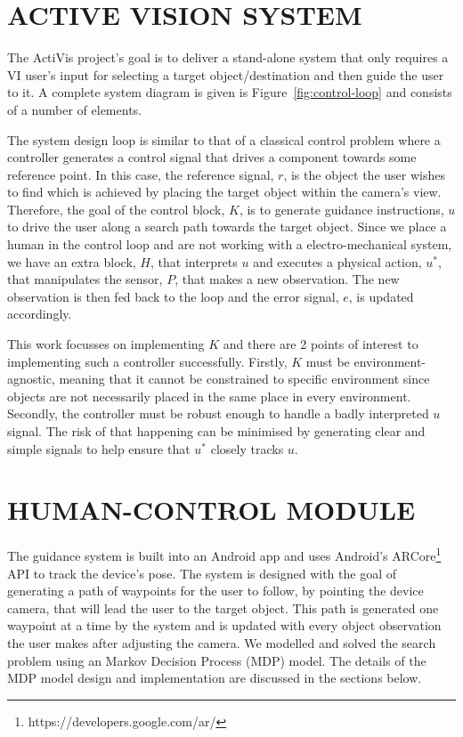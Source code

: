 \documentclass[a4paper, twoside]{article}
\begin{document}
\section{\uppercase{Active Vision System}}\label{sec:system-design}

\noindent The ActiVis project's goal is to deliver a stand-alone system that only requires a VI user's input for selecting a target object/destination and then guide the user to it. A complete system diagram is given is Figure~\ref{fig:control-loop} and consists of a number of elements.

The system design loop is similar to that of a classical control problem where a controller generates a control signal that drives a component towards some reference point. In this case, the reference signal, $r$, is the object the user wishes to find which is achieved by placing the target object within the camera's view. Therefore, the goal of the control block, $K$, is to generate guidance instructions, $u$ to drive the user along a search path towards the target object. Since we place a human in the control loop and are not working with a electro-mechanical system, we have an extra block, $H$, that interprets $u$ and executes a physical action, $u^*$, that manipulates the sensor, $P$, that makes a new observation. The new observation is then fed back to the loop and the error signal, $e$, is updated accordingly.  

This work focusses on implementing $K$ and there are 2 points of interest to implementing such a controller successfully. Firstly, $K$ must be environment-agnostic, meaning that it cannot be constrained to specific environment since objects are not necessarily placed in the same place in every environment. Secondly, the controller must be robust enough to handle a badly interpreted $u$ signal. The risk of that happening can be minimised by generating clear and simple signals to help ensure that $u^*$ closely tracks $u$. 

\section{\uppercase{Human-control Module}}\label{sec:controller-design}

\noindent The guidance system is built into an Android app and uses Android's ARCore\footnote{https://developers.google.com/ar/} API to track the device's pose. The system is designed with the goal of generating a path of waypoints for the user to follow, by pointing the device camera, that will lead the user to the target object. This path is generated one waypoint at a time by the system and is updated with every object observation the user makes after adjusting the camera. We modelled and solved the search problem using an Markov Decision Process (MDP) model. The details of the MDP model design and implementation are discussed in the sections below. %
\end{document}
